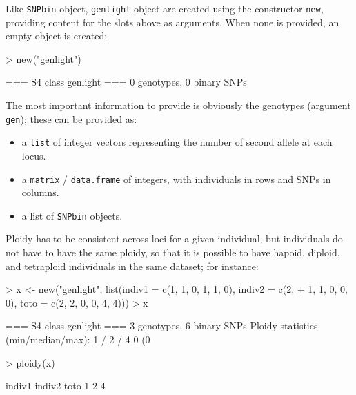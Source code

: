 \documentclass{article}
\begin{document}
\noindent Like \texttt{SNPbin} object, \texttt{genlight} object are created using the constructor \texttt{new},
providing content for the slots above as arguments.
When none is provided, an empty object is created:
\begin{Schunk}
\begin{Sinput}
> new("genlight")
\end{Sinput}
\begin{Soutput}
 === S4 class genlight ===
 0 genotypes,  0 binary SNPs
\end{Soutput}
\end{Schunk}
The most important information to provide is obviously the genotypes (argument \texttt{gen}); these
can be provided as:
\begin{itemize}
\item a \texttt{list} of integer vectors representing the number of second allele at each locus.
\item a \texttt{matrix} / \texttt{data.frame} of integers, with individuals in rows and SNPs in columns.
\item a list of \texttt{SNPbin} objects.
\end{itemize}

Ploidy has to be consistent across loci for a given individual, but individuals do not have to have
the same ploidy, so that it is possible to have hapoid,
diploid, and tetraploid individuals in the same dataset; for instance:
\begin{Schunk}
\begin{Sinput}
> x <- new("genlight", list(indiv1 = c(1, 1, 0, 1, 1, 0), indiv2 = c(2, 
+     1, 1, 0, 0, 0), toto = c(2, 2, 0, 0, 4, 4)))
> x
\end{Sinput}
\begin{Soutput}
 === S4 class genlight ===
 3 genotypes,  6 binary SNPs
 Ploidy statistics (min/median/max): 1 / 2 / 4
 0 (0 %
\end{Soutput}
\begin{Sinput}
> ploidy(x)
\end{Sinput}
\begin{Soutput}
indiv1 indiv2   toto 
     1      2      4 
\end{Soutput}
\end{Schunk}
\end{document}
